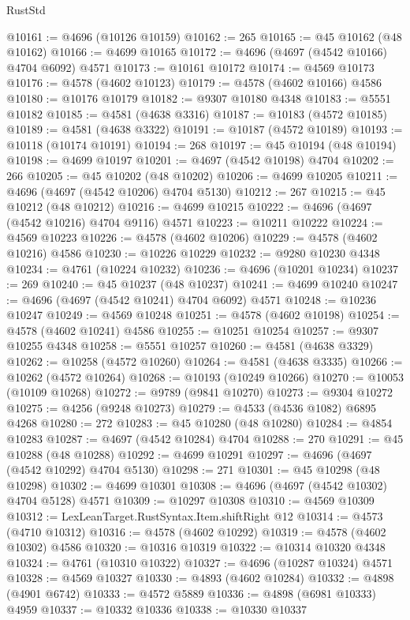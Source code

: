 \begin{lexlean}{RustStd}
\begin{coremodule}
@10161 := @4696 (@10126 @10159)
@10162 := 265
@10165 := @45 @10162 (@48 @10162)
@10166 := @4699 @10165
@10172 := @4696 (@4697 (@4542 @10166) @4704 @6092) @4571
@10173 := @10161 @10172
@10174 := @4569 @10173
@10176 := @4578 (@4602 @10123)
@10179 := @4578 (@4602 @10166) @4586
@10180 := @10176 @10179
@10182 := @9307 @10180 @4348
@10183 := @5551 @10182
@10185 := @4581 (@4638 @3316)
@10187 := @10183 (@4572 @10185)
@10189 := @4581 (@4638 @3322)
@10191 := @10187 (@4572 @10189)
@10193 := @10118 (@10174 @10191)
@10194 := 268
@10197 := @45 @10194 (@48 @10194)
@10198 := @4699 @10197
@10201 := @4697 (@4542 @10198) @4704
@10202 := 266
@10205 := @45 @10202 (@48 @10202)
@10206 := @4699 @10205
@10211 := @4696 (@4697 (@4542 @10206) @4704 @5130)
@10212 := 267
@10215 := @45 @10212 (@48 @10212)
@10216 := @4699 @10215
@10222 := @4696 (@4697 (@4542 @10216) @4704 @9116) @4571
@10223 := @10211 @10222
@10224 := @4569 @10223
@10226 := @4578 (@4602 @10206)
@10229 := @4578 (@4602 @10216) @4586
@10230 := @10226 @10229
@10232 := @9280 @10230 @4348
@10234 := @4761 (@10224 @10232)
@10236 := @4696 (@10201 @10234)
@10237 := 269
@10240 := @45 @10237 (@48 @10237)
@10241 := @4699 @10240
@10247 := @4696 (@4697 (@4542 @10241) @4704 @6092) @4571
@10248 := @10236 @10247
@10249 := @4569 @10248
@10251 := @4578 (@4602 @10198)
@10254 := @4578 (@4602 @10241) @4586
@10255 := @10251 @10254
@10257 := @9307 @10255 @4348
@10258 := @5551 @10257
@10260 := @4581 (@4638 @3329)
@10262 := @10258 (@4572 @10260)
@10264 := @4581 (@4638 @3335)
@10266 := @10262 (@4572 @10264)
@10268 := @10193 (@10249 @10266)
@10270 := @10053 (@10109 @10268)
@10272 := @9789 (@9841 @10270)
@10273 := @9304 @10272
@10275 := @4256 (@9248 @10273)
@10279 := @4533 (@4536 @1082) @6895 @4268
@10280 := 272
@10283 := @45 @10280 (@48 @10280)
@10284 := @4854 @10283
@10287 := @4697 (@4542 @10284) @4704
@10288 := 270
@10291 := @45 @10288 (@48 @10288)
@10292 := @4699 @10291
@10297 := @4696 (@4697 (@4542 @10292) @4704 @5130)
@10298 := 271
@10301 := @45 @10298 (@48 @10298)
@10302 := @4699 @10301
@10308 := @4696 (@4697 (@4542 @10302) @4704 @5128) @4571
@10309 := @10297 @10308
@10310 := @4569 @10309
@10312 := LexLeanTarget.RustSyntax.Item.shiftRight @12
@10314 := @4573 (@4710 @10312)
@10316 := @4578 (@4602 @10292)
@10319 := @4578 (@4602 @10302) @4586
@10320 := @10316 @10319
@10322 := @10314 @10320 @4348
@10324 := @4761 (@10310 @10322)
@10327 := @4696 (@10287 @10324) @4571
@10328 := @4569 @10327
@10330 := @4893 (@4602 @10284)
@10332 := @4898 (@4901 @6742)
@10333 := @4572 @5889
@10336 := @4898 (@6981 @10333) @4959
@10337 := @10332 @10336
@10338 := @10330 @10337

\end{coremodule}
\end{lexlean}
